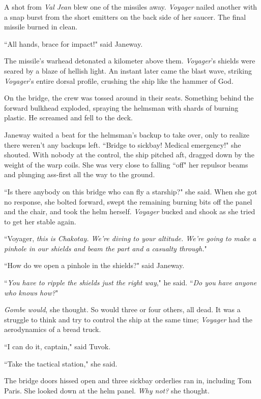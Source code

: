 \documentclass[twoside,letterpaper,12pt]{memoir}
\begin{document}
A shot from \textit{Val Jean} blew one of the missiles away. \textit{Voyager} nailed another with a snap burst from the short emitters on the back side of her saucer. The final missile burned in clean.

``All hands, brace for impact!" said Janeway.

The missile's warhead detonated a kilometer above them. \textit{Voyager}'s shields were seared by a blaze of hellish light. An instant later came the blast wave, striking \textit{Voyager}'s entire dorsal profile, crushing the ship like the hammer of God.

On the bridge, the crew was tossed around in their seats. Something behind the forward bulkhead exploded, spraying the helmsman with shards of burning plastic. He screamed and fell to the deck.

Janeway waited a beat for the helmsman's backup to take over, only to realize there weren't any backups left. ``Bridge to sickbay! Medical emergency!" she shouted. With nobody at the control, the ship pitched aft, dragged down by the weight of the warp coils. She was very close to falling ``off" her repulsor beams and plunging ass-first all the way to the ground.

``Is there anybody on this bridge who can fly a starship?" she said. When she got no response, she bolted forward, swept the remaining burning bits off the panel and the chair, and took the helm herself. \textit{Voyager} bucked and shook as she tried to get her stable again.

``Voyager, \textit{this is Chakotay. We're diving to your altitude. We're going to make a pinhole in our shields and beam the part and a casualty through.}"

``How do we open a pinhole in the shields?" said Janeway.

``\textit{You have to ripple the shields just the right way}," he said. ``\textit{Do you have anyone who knows how?}"

\textit{Gombe would}, she thought. So would three or four others, all dead. It was a struggle to think and try to control the ship at the same time; \textit{Voyager} had the aerodynamics of a bread truck.

``I can do it, captain," said Tuvok.

``Take the tactical station," she said.

The bridge doors hissed open and three sickbay orderlies ran in, including Tom Paris. She looked down at the helm panel. \textit{Why not?} she thought.
\end{document}
